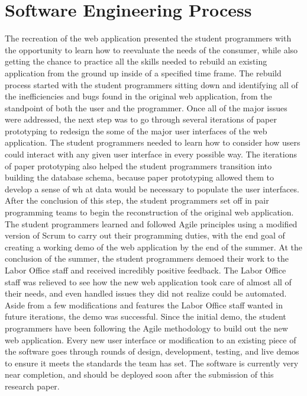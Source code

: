\section{Software Engineering Process}

The recreation of the web application presented the student programmers with the opportunity to learn how to reevaluate the needs of the consumer, while also getting the chance to practice all the skills needed to rebuild an existing application from the ground up inside of a specified time frame. The rebuild process started with the student programmers sitting down and identifying all of the inefficiencies and bugs found in the original web application, from the standpoint of both the user and the programmer. Once all of the major issues were addressed, the next step was to go through several iterations of paper prototyping to redesign the some of the major user interfaces of the web application. The student programmers needed to learn how to consider how users could interact with any given user interface in every possible way. The iterations of paper prototyping also helped the student programmers transition into building the database schema, because paper prototyping allowed them to develop a sense of wh at data would be necessary to populate the user interfaces. After the conclusion of this step, the student programmers set off in pair programming teams to begin the reconstruction of the original web application. The student programmers learned and followed Agile principles using a modified version of Scrum to carry out their programming duties, with the end goal of creating a working demo of the web application by the end of the summer. At the conclusion of the summer, the student programmers demoed their work to the Labor Office staff and received incredibly positive feedback. The Labor Office staff was relieved to see how the new web application took care of almost all of their needs, and even handled issues they did not realize could be automated. Aside from a few modifications and features the Labor Office staff wanted in future iterations, the demo was successful. Since the initial demo, the student programmers have been following the Agile methodology to build out the new web application. Every new user interface or modification to an existing piece of the software goes through rounds of design, development, testing, and live demos to ensure it meets the standards the team has set. The software is currently very near completion, and should be deployed soon after the submission of this research paper.


